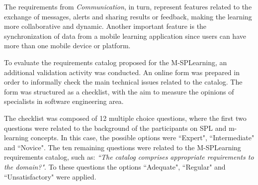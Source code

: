 The requirements from \textit{Communication}, in turn, represent features related to the exchange of messages, alerts and sharing results or feedback, making the learning more collaborative and dynamic. Another important feature is the synchronization of data from a mobile learning application since users can have more than one mobile device or platform.

To evaluate the requirements catalog proposed for the M-SPLearning, an additional validation activity was conducted. An online form was prepared in order to informally check the main technical issues related to the catalog. The form was structured as a checklist, with the aim to measure the opinions of specialists in software engineering area.

The checklist was composed of 12 multiple choice questions, where the first two questions were related to the background of the participants on SPL and m-learning concepts. In this case, the possible options were ``Expert", ``Intermediate" and ``Novice". The ten remaining questions were related to the M-SPLearning requirements catalog, such as: \textit{``The catalog comprises appropriate requirements to the domain?"}. To these questions the options ``Adequate", ``Regular" and ``Unsatisfactory" were applied.

